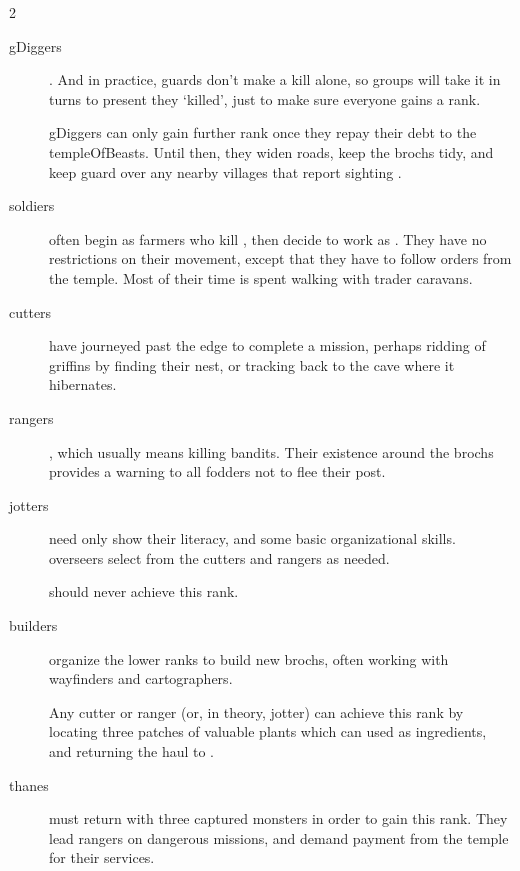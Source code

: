 \begin{multicols}{2}
\begin{description}
  \item[\Glspl{gDigger}]
  .
  And in practice, \glspl{guard} don't make a kill alone, so groups will take it in turns to present  they `killed', just to make sure everyone gains a rank.

  \Glspl{gDigger} can only gain further rank once they repay their debt to the \gls{templeOfBeasts}.
  Until then, they widen roads, keep the \glspl{broch} tidy, and keep guard over any nearby \glspl{village} that report sighting .

  \item[\Glspl{soldier}]
  often begin as farmers who kill , then decide to work as .
  They have no restrictions on their movement, except that they have to follow orders from the \gls{temple}.
  Most of their time is spent walking with trader caravans.

  \item[\Glspl{cutter}]
  have journeyed past the \gls{edge} to complete a mission, perhaps ridding  of \glspl{griffin} by finding their nest, or tracking  back to the cave where it hibernates.

  \item[\Glspl{ranger}]
  \label{ranger}
  , which usually means killing bandits.
  Their existence around the \glspl{broch} provides a warning to all \glspl{fodder} not to flee their post.

  \item[\Glspl{jotter}]
  \label{jotter}%
  need only show their literacy, and some basic organizational skills.
  \Glspl{overseer} select  from the \glspl{cutter} and \glspl{ranger} as needed.

   should never achieve this rank.

  \item[\Glspl{builder}]
  organize the lower ranks to build new \glspl{broch}, often working with \glspl{wayfinder} and \glspl{cartographer}.

  Any \gls{cutter} or \gls{ranger} (or, in theory, \gls{jotter}) can achieve this rank by locating three patches of valuable plants which can used as \glspl{ingredient}, and returning the haul to .

  \item[\Glspl{thane}]
  \label{thanes}
  must return with three captured \glspl{monster} in order to gain this rank.
  They lead \glspl{ranger} on dangerous missions, and demand payment from the \gls{temple} for their services.


\end{description}
\end{multicols}
